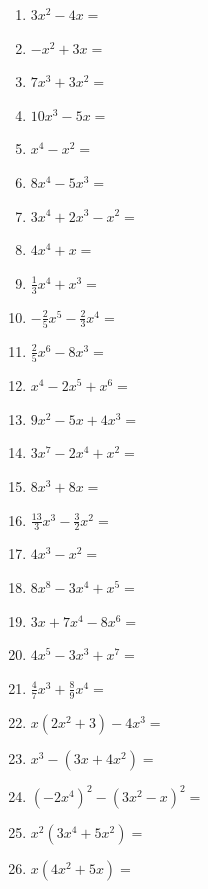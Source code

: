\begin{Exercise}[title={Klammere so viele \(x\) wie möglich vor (ohne, dass \(x\) im Nenner eines Bruches benötigt wird)}, label=ausklammernA1]

	\begin{minipage}{\textwidth}
		\begin{minipage}{0.5\textwidth}
			\begin{enumerate}[label=\alph*)]
				\item \(3x^2-4x=\)
				\item \(-x^2+3x=\)
				\item \(7x^3+3x^2=\)
				\item \(10x^3-5x=\)
				\item \(x^4-x^2=\)
				\item \(8x^4-5x^3=\)
				\item \(3x^4+2x^3-x^2=\)
				\item \(4x^4+x=\)
				\item \(\frac{1}{3}x^4+x^3=\)
				\item \(-\frac{2}{5}x^5-\frac{2}{3}x^4=\)
				\item \(\frac{2}{5}x^6-8x^3=\)
				\item \(x^4-2x^5+x^6=\)
				\item \(9x^2-5x+4x^3=\)
			\end{enumerate}
		\end{minipage}%
		\begin{minipage}{0.5\textwidth}
			\begin{enumerate}[label=\alph*)]
				\setcounter{enumi}{13}
				\item \(3x^7-2x^4+x^2=\)
				\item \(8x^3+8x=\)
				\item \(\frac{13}{3}x^3-\frac{3}{2}x^2=\)
				\item \(4x^3-x^2=\)
				\item \(8x^8-3x^4+x^5=\)
				\item \(3x+7x^4-8x^6=\)
				\item \(4x^5-3x^3+x^7=\)
				\item \(\frac{4}{7}x^3+\frac{8}{9}x^4=\)
				\item \(x\left( 2x^2+3\right) -4x^3=\)
				\item \(x^3-\left( 3x+4x^2\right)=\)
				\item \(\left(-2x^4\right)^2 -\left(3x^2-x\right)^2 =\)
				\item \(x^2\left(3x^4+5x^2\right) =\)
				\item \(x\left(4x^2+5x\right) =\)
			\end{enumerate}
		\end{minipage}%
	\end{minipage}%
\end{Exercise}
